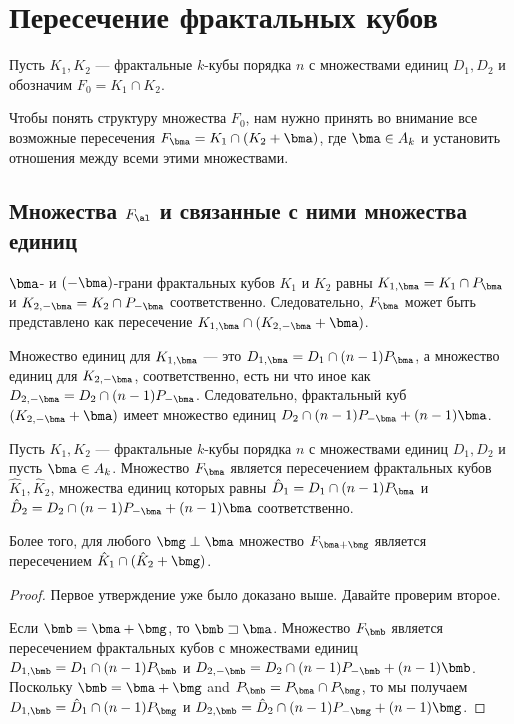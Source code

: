 \section{Пересечение фрактальных кубов}

Пусть $K_1, K_2$ --- фрактальные $k$-кубы порядка $n$ с множествами единиц $D_1, D_2$ и обозначим $F_0=K_1\cap K_2$.

Чтобы понять структуру множества $F_0$, нам нужно принять во внимание все возможные пересечения $F_\bma=K_1\cap (K_2+\bma)$,
где $\bma\in A_k$ и установить отношения между всеми этими множествами.

\subsection{Множества $F_\al$ и связанные с ними множества единиц}

$\bma$- и $(-\bma)$-грани фрактальных кубов $K_1$ и $K_2$ равны $K_{1,\bma}=K_1\cap P_\bma$ и $K_{2,-\bma}=K_2\cap P_{-\bma}$ соответственно.
Следовательно, $F_\bma$ может быть представлено как пересечение $K_{1,\bma}\cap (K_{2,-\bma}+\bma)$.

Множество единиц для $K_{1,\bma}$ --- это $D_{1,\bma}= D_1\cap(n-1)P_\bma$, а множество единиц для $K_{2,-\bma}$, соответственно, есть ни что иное как $D_{2,-\bma}= D_2\cap(n-1)P_{-\bma}$.
Следовательно, фрактальный куб $(K_{2,-\bma}+\bma)$ имеет множество единиц $D_2\cap(n-1)P_{-\bma}+(n-1)\bma$.
   
\begin{proposition}\label{falfa}
Пусть $K_1,K_2$ --- фрактальные $k$-кубы порядка $n$ с множествами единиц $D_1, D_2$ и пусть $\bma\in A_k$.
Множество $F_\bma$ является пересечением фрактальных кубов $\hat K_1,\hat K_2$, множества единиц которых равны $\hat D_1=D_1\cap(n-1)P_\bma$ и $\hat D_{2}=D_2\cap(n-1)P_{-\bma}+(n-1)\bma$ соответственно.

Более того, для любого $\bmg\perp\bma$ множество $F_{\bma+\bmg}$ является пересечением $\hat K_{1}\cap(\hat K_{2}+\bmg)$.
\end{proposition}  

\begin{proof} 
Первое утверждение уже было доказано выше. Давайте проверим второе.

Если $\bmb=\bma+\bmg $, то $\bmb\sqsupset\bma$.
Множество $F_\bmb$ является пересечением фрактальных кубов с множествами единиц $D_{1,\bmb}=D_1\cap(n-1)P_\bmb$ и $D_{2,-\bmb}=D_2\cap(n-1)P_{-\bmb}+(n-1)\bmb$.
Поскольку $\bmb=\bma+\bmg$ and $P_\bmb=P_\bma\cap P_\bmg$, то мы получаем $D_{1,\bmb}=\hat D_{1}\cap(n-1)P_\bmg$ и $D_{2,\bmb}=\hat D_{2}\cap(n-1)P_{-\bmg}+(n-1)\bmg$.
\end{proof}


